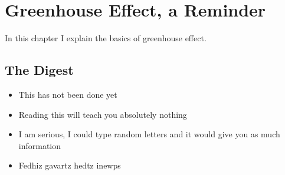 \setchapterpreamble[u]{\margintoc}
\chapter{Greenhouse Effect, a Reminder}

In this chapter I explain the basics of greenhouse effect.


\blindtext


\section{The Digest}


\begin{kaoboxgreen}[frametitle=Main Takeaways]

\begin{itemize}
\item This has not been done yet
\item Reading this will teach you absolutely nothing
\item I am serious, I could type random letters and it would give you as much information
\item Fedhiz gavartz hedtz inewps
\end{itemize}
  
\end{kaoboxgreen}